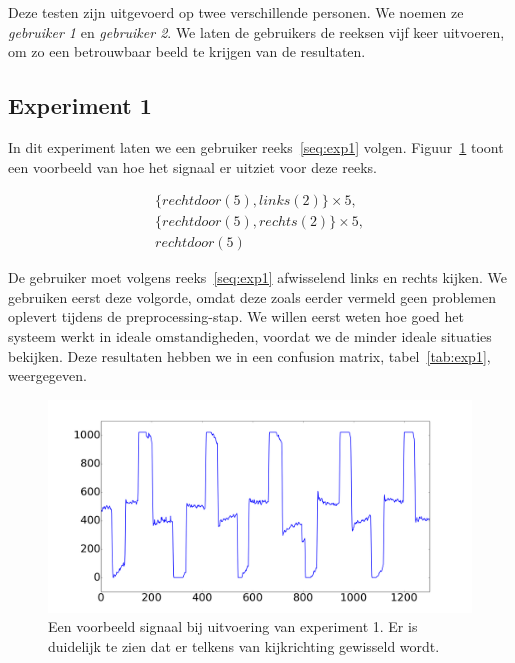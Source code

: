 \documentclass{article}
\begin{document}
Deze testen zijn uitgevoerd op twee verschillende personen. We noemen ze \textit{gebruiker 1} en \textit{gebruiker 2}. We laten de gebruikers de reeksen vijf keer uitvoeren, om zo een betrouwbaar beeld te krijgen van de resultaten.

\subsection{Experiment 1}

In dit experiment laten we een gebruiker reeks~\ref{seq:exp1} volgen. Figuur~\ref{fig:exp1} toont een voorbeeld van hoe het signaal er uitziet voor deze reeks. 

\begin{equation}
\begin{aligned}
\label{seq:exp1}
& \{rechtdoor(5), links(2)\} \times 5,& \\
& \{rechtdoor(5), rechts(2)\} \times 5,& \\
& rechtdoor(5) &
\end{aligned}
\end{equation}

De gebruiker moet volgens reeks~\ref{seq:exp1} afwisselend links en rechts kijken. We gebruiken eerst deze volgorde, omdat deze zoals eerder vermeld geen problemen oplevert tijdens de preprocessing-stap. We willen eerst weten hoe goed het systeem werkt in ideale omstandigheden, voordat we de minder ideale situaties bekijken. Deze resultaten hebben we in een confusion matrix, tabel~\ref{tab:exp1}, weergegeven.


\begin{figure}[h]
\centering
\includegraphics[width=\linewidth]{images/experiment1}
\caption{Een voorbeeld signaal bij uitvoering van experiment 1. Er is duidelijk te zien dat er telkens van kijkrichting gewisseld wordt.}
\label{fig:exp1}
\end{figure}
\end{document}
